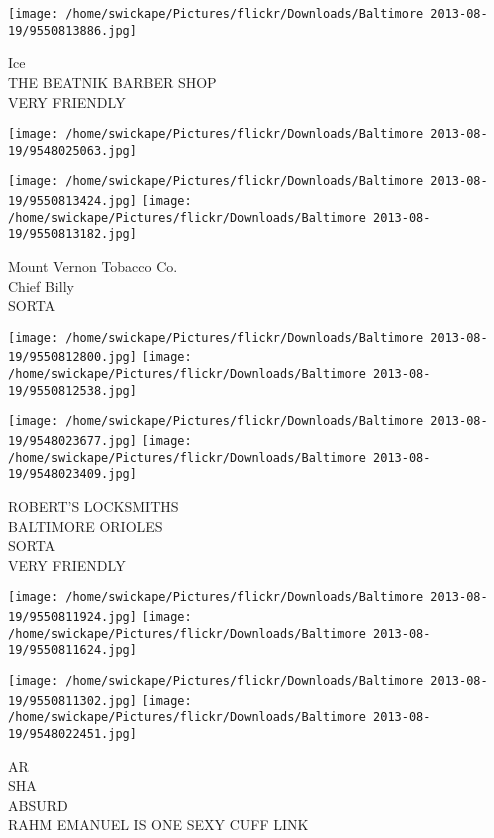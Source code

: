 \documentclass[10pt,letterpaper]{article}
\begin{document}
\texttt{[image: /home/swickape/Pictures/flickr/Downloads/Baltimore 2013-08-19/9550813886.jpg]}

Ice\\
THE BEATNIK BARBER SHOP\\
VERY FRIENDLY\\
\pagebreak

\texttt{[image: /home/swickape/Pictures/flickr/Downloads/Baltimore 2013-08-19/9548025063.jpg]}

\vspace{0.25in}
\texttt{[image: /home/swickape/Pictures/flickr/Downloads/Baltimore 2013-08-19/9550813424.jpg]}
\texttt{[image: /home/swickape/Pictures/flickr/Downloads/Baltimore 2013-08-19/9550813182.jpg]}

Mount Vernon Tobacco Co.\\
Chief Billy\\
SORTA\\
\pagebreak

\texttt{[image: /home/swickape/Pictures/flickr/Downloads/Baltimore 2013-08-19/9550812800.jpg]}
\texttt{[image: /home/swickape/Pictures/flickr/Downloads/Baltimore 2013-08-19/9550812538.jpg]}

\texttt{[image: /home/swickape/Pictures/flickr/Downloads/Baltimore 2013-08-19/9548023677.jpg]}
\texttt{[image: /home/swickape/Pictures/flickr/Downloads/Baltimore 2013-08-19/9548023409.jpg]}

ROBERT'S LOCKSMITHS\\
BALTIMORE ORIOLES\\
SORTA\\
VERY FRIENDLY\\
\pagebreak

\texttt{[image: /home/swickape/Pictures/flickr/Downloads/Baltimore 2013-08-19/9550811924.jpg]}
\texttt{[image: /home/swickape/Pictures/flickr/Downloads/Baltimore 2013-08-19/9550811624.jpg]}

\texttt{[image: /home/swickape/Pictures/flickr/Downloads/Baltimore 2013-08-19/9550811302.jpg]}
\texttt{[image: /home/swickape/Pictures/flickr/Downloads/Baltimore 2013-08-19/9548022451.jpg]}

AR\\
SHA\\
ABSURD\\
RAHM EMANUEL IS ONE SEXY CUFF LINK\\
\pagebreak
\end{document}
